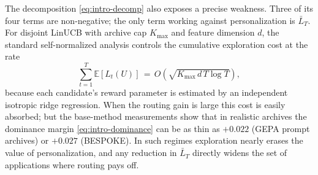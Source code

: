 \documentclass{article} %
\providecommand{\E}{\mathbb{E}}
\begin{document}
The decomposition \eqref{eq:intro-decomp} also exposes a precise weakness. Three of its four terms are non-negative; the only term working against personalization is $\bar L_T$. For disjoint LinUCB with archive cap $K_{\max}$ and feature dimension $d$, the standard self-normalized analysis \citep{abbasi2011oful,chu2011linucb} controls the cumulative exploration cost at the rate
\begin{equation}
\label{eq:intro-linucb-cost}
\sum_{t=1}^{T}\E[L_t(U)]
\,=\,
O\!\left(\sqrt{K_{\max}\, d\, T \log T}\right),
\end{equation}
because each candidate's reward parameter is estimated by an independent isotropic ridge regression. When the routing gain is large this cost is easily absorbed; but the base-method measurements show that in realistic archives the dominance margin \eqref{eq:intro-dominance} can be as thin as $+0.022$ (GEPA prompt archives) or $+0.027$ (BESPOKE). In such regimes exploration nearly erases the value of personalization, and any reduction in $\bar L_T$ directly widens the set of applications where routing pays off.
\end{document}
